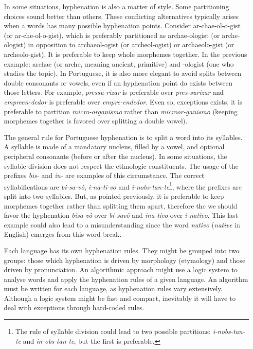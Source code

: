 \documentclass{article}
\begin{document}
In some situations, hyphenation is also a matter of style. Some partitioning
choices sound better than others. These conflicting alternatives typically
arises when a words has many possible hyphenation points. Consider
ar-chae-ol-o-gist (or ar-che-ol-o-gist), which is preferably partitioned as
archae-ologist (or arche-ologist) in opposition to archaeol-ogist (or
archeol-ogist) or archaeolo-gist (or archeolo-gist). It is preferable to keep
whole morphemes together. In the previous example: archae (or arche, meaning
ancient, primitive)
and -ologist (one who studies the topic). In Portuguese, it is also more
elegant to avoid splits between double consonants or vowels, even if an
hyphenation point do exists between those letters. For example,
\emph{pressu-rizar} is preferable over \emph{pres-surizar} and
\emph{empreen-dedor} is preferable over \emph{empre-endedor}. Even so,
exceptions exists, it is preferable to partition \emph{micro-organismo}
rather than \emph{microor-ganismo} (keeping morphemes together is favored
over splitting a double vowel).

The general rule for Portuguese hyphenation is to split a word into its
syllables. A syllable is made of a mandatory nucleus, filled by a vowel, and
optional peripheral consonants (before or after the nucleus). In some
situations, the syllabic division does not respect the ethnologic constituents.
The usage of the prefixes \emph{bis-} and \emph{in-} are examples of this
circumstance. The correct syllabifications are \emph{bi-sa-vô},
\emph{i-na-ti-vo} and \emph{i-nobs-tan-te}\footnote{The rule of syllable
division could lead to two possible partitions: \emph{i-nobs-tan-te} and
\emph{in-obs-tan-te}, but the first is preferable.}, where the prefixes are
split into two syllables. But, as pointed previously, it is preferable to keep
morphemes together rather than splitting them apart, therefore the we should
favor the hyphenation \emph{bisa-vô} over \emph{bi-savô} and \emph{ina-tivo}
over \emph{i-nativo}. This last example could also lead to a misunderstanding
since the word \emph{nativo} (\emph{native} in English) emerges from this word
break. 



Each language has its own hyphenation rules. They might be grouped into two
groups: those which hyphenation is driven by morphology (etymology) and those
driven by pronunciation. An algorithmic approach might use a logic system to
analyse words and apply the hyphenation rules of a given language. An algorithm
must be written for each language, as hyphenation rules vary extensively.
Although a logic system might be fast and compact, inevitably it will have to
deal with exceptions through hard-coded rules.
\end{document}

